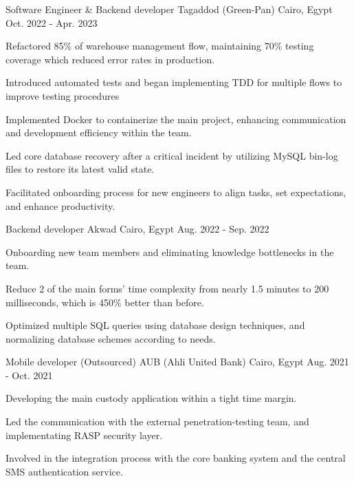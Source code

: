 \begin{cventries}
  \cventry
    {Software Engineer \& Backend developer} %
    {Tagaddod (Green-Pan)} %
    {Cairo, Egypt} %
    {Oct. 2022 - Apr. 2023} %
    {
      \begin{cvitems} %
        \item {Refactored 85\% of warehouse management flow, maintaining 70\% testing coverage which reduced error rates in production.}
        \item {Introduced automated tests and began implementing TDD for multiple flows to improve testing procedures}
        \item {Implemented Docker to containerize the main project, enhancing communication and development efficiency within the team.}
        \item {Led core database recovery after a critical incident by utilizing MySQL bin-log files to restore its latest valid state.
              }
        \item {Facilitated onboarding process for new engineers to align tasks, set expectations, and enhance productivity.}
      \end{cvitems}
    }

  \cventry
    {Backend developer} %
    {Akwad} %
    {Cairo, Egypt} %
    {Aug. 2022 - Sep. 2022} %
    {
      \begin{cvitems} %
        \item {Onboarding new team members and eliminating knowledge bottlenecks in the team.}
        \item {Reduce 2 of the main forms' time complexity from nearly 1.5 minutes to 200 milliseconds, which is 450\% better than before.}
        \item {Optimized multiple SQL queries using database design techniques, and normalizing database schemes according to needs.}
      \end{cvitems}
    }

  \cventry
    {Mobile developer (Outsourced)} %
    {AUB (Ahli United Bank)} %
    {Cairo, Egypt} %
    {Aug. 2021 - Oct. 2021} %
    {
      \begin{cvitems} %
        \item {Developing the main custody application within a tight time margin.}
        \item {Led the communication with the external penetration-testing team, and implementating RASP security layer.}
        \item {Involved in the integration process with the core banking system and the central SMS authentication service.}
      \end{cvitems}
    }


\end{cventries}
